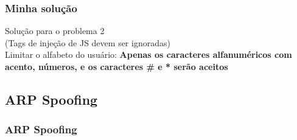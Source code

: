 \documentclass{beamer}
\begin{document}
\begin{frame}
	\frametitle{Minha solução}
	Solução para o problema 2\\
	(Tags de injeção de JS devem ser ignoradas)\\
	Limitar o alfabeto do usuário:
	\textbf{Apenas os caracteres alfanuméricos com acento, números, e os caracteres \# e * serão aceitos}

\end{frame}

\subsection{ARP Spoofing}
\begin{frame}
\frametitle{ARP Spoofing}
\end{frame}
\end{document}

